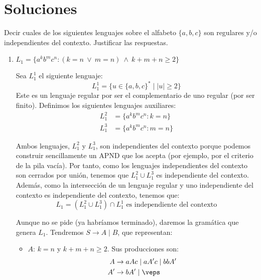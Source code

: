 \documentclass[12pt]{article}
\begin{document}
    \newpage
    \section*{Soluciones}
    \setcounter{ejercicio}{0}
    \begin{ejercicio}[2.5 puntos]
        Decir cuales de los siguientes lenguajes sobre el alfabeto $\{a, b, c\}$ son regulares y/o independientes del contexto. Justificar las respuestas.
        \begin{enumerate}
            \item $L_1 = \{a^k b^m c^n : (k = n ~\lor~ m = n) ~\land~ k + m + n \geq 2\}$
            
            Sea $L_1^1$ el siguiente lenguaje:
            \begin{equation*}
                L_1^1 = \{u\in \{a,b,c\}^* \mid |u| \geq 2\}
            \end{equation*}
            Este es un lenguaje regular por ser el complementario de uno regular (por ser finito). Definimos los siguientes lenguajes auxiliares:
            \begin{align*}
                L_1^2 &= \{a^k b^m c^n : k = n\} \\
                L_1^3 &= \{a^k b^m c^n : m = n\}
            \end{align*}
            
            Ambos lenguajes, $L_1^2$ y $L_1^3$, son independientes del contexto porque podemos construir sencillamente un APND que los acepta (por ejemplo, por el criterio de la pila vacía). Por tanto, como los lenguajes independientes del contexto son cerrados por unión, tenemos que $L_1^2 \cup L_1^3$ es independiente del contexto. Además, como la intersección de un lenguaje regular y uno independiente del contexto es independiente del contexto, tenemos que:
            \begin{equation*}
                L_1 = (L_1^2 \cup L_1^3) \cap L_1^1 \text{ es independiente del contexto}
            \end{equation*}

            Aunque no se pide (ya habríamos terminado), daremos la gramática que genera $L_1$. Tendremos $S\rightarrow A\mid B$, que representan:
            \begin{itemize}
                \item $A$: $k=n$ y $k+m+n\geq 2$. Sus producciones son:
                \begin{align*}
                    A &\rightarrow aAc \mid aA'c \mid bbA'\\
                    A' &\rightarrow bA' \mid \veps
                \end{align*}


\end{itemize}
\end{enumerate}
\end{ejercicio}
\end{document}
